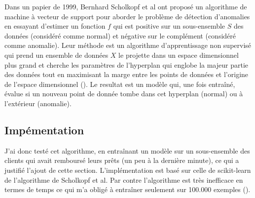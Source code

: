Dans un papier de 1999, Bernhard Scholkopf et al ont proposé un algorithme de machine à vecteur de support pour aborder le problème de détection d'anomalies en essayant d'estimer un
fonction \(f\) qui est positive sur un sous-ensemble \(S\) des données (considéré comme normal) et négative sur le complément (considéré comme anomalie). Leur méthode est un algorithme d'apprentissage non supervisé qui prend un ensemble de données \(X\) le projette dans un espace dimensionnel plus grand et cherche les paramètres de l'hyperplan qui englobe la majeur partie des données tout en maximisant la marge entre les points de données et l'origine de l'espace dimensionnel (\cite{scholkopf1999support}). Le resultat est un modèle qui, une fois entraîné, évalue si un nouveau point de donnée tombe dans cet hyperplan (normal) ou à l'extérieur (anomalie).

\subsection{Impémentation}
\label{chap4.sec8.sub2}
J'ai donc testé cet algorithme, en entraînant un modèle sur un sous-ensemble des clients qui avait remboursé leurs prêts (un peu à la dernière minute), ce qui a justifié l'ajout de cette section. L'implémentation est basé sur celle de scikit-learn de l'algorithme de Scholkopf et al. Par contre l'algorithme est très inefficace en termes de temps ce qui m'a obligé à entraîner seulement sur 100.000 exemples (\cite{diarra2024anomaly}).